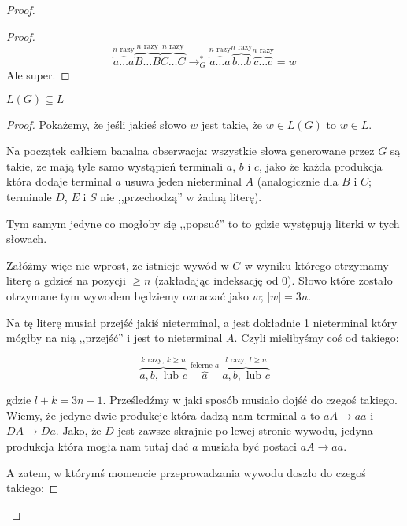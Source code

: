 \begin{proof}
\begin{proof}
        \[ 
            \overbrace{a \dots a}^{\text{\(n\) razy}} \overbrace{B \dots B}^{\text{\(n\) razy}}
            \overbrace{C \dots C}^{\text{\(n\) razy}}
            \rightarrow_G^{*}
            \overbrace{a \dots a}^{\text{\(n\) razy}} \overbrace{b \dots b}^{\text{\(n\) razy}}
            \overbrace{c \dots c}^{\text{\(n\) razy}}
            = w
        \]
        Ale super.
    \end{proof}
    
    \begin{lemma}
        \(L(G) \subseteq L\)
    \end{lemma}
    \begin{proof}
        Pokażemy, że jeśli jakieś słowo \(w\) jest takie, że \(w \in L(G)\) to \(w \in L\). 
        
        Na początek całkiem banalna obserwacja: wszystkie słowa generowane przez \(G\) są takie, że mają tyle samo wystąpień terminali \(a\), \(b\) i \(c\), jako że każda produkcja która dodaje terminal \(a\) usuwa jeden nieterminal \(A\) (analogicznie dla \(B\) i \(C\); terminale \(D\), \(E\) i \(S\) nie ,,przechodzą'' w żadną literę). 
        
        Tym samym jedyne co mogłoby się ,,popsuć'' to to gdzie występują literki w tych słowach.
        
        Załóżmy więc nie wprost, że istnieje wywód w \(G\) w wyniku którego otrzymamy literę \(a\) gdzieś na pozycji \( \geq n\) (zakładając indeksację od 0). Słowo które zostało otrzymane tym wywodem będziemy oznaczać jako \(w\); \( |w| = 3n\).
        
        Na tę literę musiał przejść jakiś nieterminal, a jest dokładnie 1 nieterminal który mógłby na nią ,,przejść'' i jest to nieterminal \(A\). Czyli mielibyśmy coś od takiego:
        
        \[
            \overbrace{a, b, \text{ lub } c}^{\text{\(k\) razy, \(k \geq n\)}} \; \overbrace{a}^{\text{felerne \(a\)}} \; \overbrace{a, b, \text{ lub } c}^{\text{\(l\) razy, \(l \geq n\)}} 
        \]
        
        gdzie \( l + k = 3n - 1\). Prześledźmy w jaki sposób musiało dojść do czegoś takiego. Wiemy, że jedyne dwie produkcje która dadzą nam terminal \(a\) to \(aA \rightarrow aa\) i \(DA \rightarrow Da\). Jako, że \(D\) jest zawsze skrajnie po lewej stronie wywodu, jedyna produkcja która mogła nam tutaj dać \(a\) musiała być postaci \(aA \rightarrow aa\).
        
        A zatem, w którymś momencie przeprowadzania wywodu doszło do czegoś takiego:
        

\end{proof}
\end{proof}
